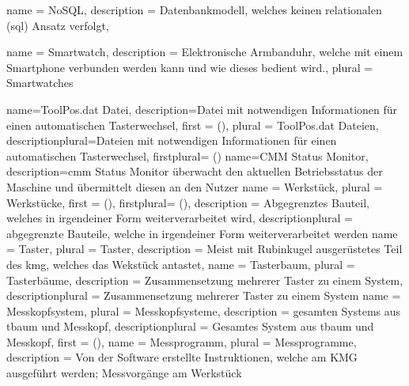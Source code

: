 {
    name = {NoSQL},
    description = {Datenbankmodell, welches keinen relationalen (\gls{sql}) Ansatz verfolgt},
}

{
    name = {Smartwatch},
    description = {Elektronische Armbanduhr, welche mit einem Smartphone verbunden werden kann und wie dieses bedient wird.},
    plural = {Smartwatches}
}


{
    name={ToolPos.dat Datei},
    description={Datei mit notwendigen Informationen für einen automatischen Tasterwechsel},
    first = { ()},
    plural = {ToolPos.dat Dateien},
    descriptionplural={Dateien mit notwendigen Informationen für einen automatischen Tasterwechsel},
    firstplural={ ()}
}
{
    name={CMM Status Monitor},
    description={\gls{cmm} Status Monitor überwacht den aktuellen Betriebsstatus der Maschine und übermittelt diesen an den Nutzer}
}
{
    name = {Werkstück},
    plural = {Werkstücke},
    first = { ()},
    firstplural={ ()},
    description = {Abgegrenztes Bauteil, welches in irgendeiner Form weiterverarbeitet wird},
    descriptionplural = {abgegrenzte Bauteile, welche in irgendeiner Form weiterverarbeitet werden}
}
{
    name = {Taster},
    plural = {Taster},
    description = {Meist mit Rubinkugel ausgerüstetes Teil des \gls{kmg}, welches das Wekstück antastet},
}
{
    name = {Tasterbaum},
    plural = {Tasterbäume},
    description = {Zusammensetzung mehrerer Taster zu einem System},
    descriptionplural = {Zusammensetzung mehrerer Taster zu einem System}
}
{
    name = {Messkopfsystem},
    plural = {Messkopfsysteme},
    description = {gesamten Systems aus \gls{tbaum} und Messkopf},
    descriptionplural = {Gesamtes System aus \gls{tbaum} und Messkopf},
    first = { ()},
}
{
    name = {Messprogramm},
    plural = {Messprogramme},
    description = {Von der Software erstellte Instruktionen, welche am KMG ausgeführt werden; Messvorgänge am Werkstück}
}
